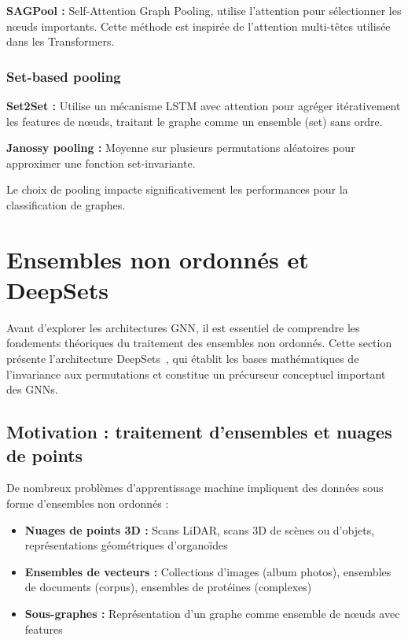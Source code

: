 \textbf{SAGPool :}
Self-Attention Graph Pooling, utilise l'attention pour sélectionner les nœuds importants. Cette méthode est inspirée de l'attention multi-têtes utilisée dans les Transformers.

\subsubsection{Set-based pooling}

\textbf{Set2Set :}
Utilise un mécanisme LSTM avec attention pour agréger itérativement les features de nœuds, traitant le graphe comme un ensemble (set) sans ordre.

\textbf{Janossy pooling :}
Moyenne sur plusieurs permutations aléatoires pour approximer une fonction set-invariante.

Le choix de pooling impacte significativement les performances pour la classification de graphes.

\section{Ensembles non ordonnés et DeepSets}

Avant d'explorer les architectures GNN, il est essentiel de comprendre les fondements théoriques du traitement des ensembles non ordonnés. Cette section présente l'architecture DeepSets~\cite{Zaheer2017}, qui établit les bases mathématiques de l'invariance aux permutations et constitue un précurseur conceptuel important des GNNs.

\subsection{Motivation : traitement d'ensembles et nuages de points}

De nombreux problèmes d'apprentissage machine impliquent des données sous forme d'ensembles non ordonnés :
\begin{itemize}
    \item \textbf{Nuages de points 3D :} Scans LiDAR, scans 3D de scènes ou d'objets, représentations géométriques d'organoïdes
    \item \textbf{Ensembles de vecteurs :} Collections d'images (album photos), ensembles de documents (corpus), ensembles de protéines (complexes)
    \item \textbf{Sous-graphes :} Représentation d'un graphe comme ensemble de nœuds avec features
\end{itemize}

